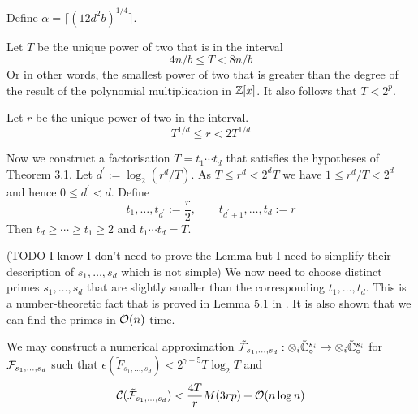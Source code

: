 Define $\alpha = \lceil (12d^2 b)^{1/4}\rceil$.





Let $T$ be the unique power of two that is in the interval
\begin{equation}
    4n/b \leq T < 8n/b
\end{equation}
Or in other words, the smallest power of two that is greater than the degree of the result of the polynomial multiplication in ${\mathbb Z}[x]$.
It also follows that $T < 2^p$.

Let $r$ be the unique power of two in the interval.
\[
    T^{1/d} \leq r < 2T^{1/d}
\]

Now we construct a factorisation $T = t_1 \cdots t_d$ that satisfies the hypotheses of Theorem 3.1. Let $d^\prime := \log_2(r^d / T)$. As $T \leq r^d < 2^d T$ we have $1 \leq r^d / T < 2^d$ and hence $0 \leq d^\prime < d$. Define
\[
    t_1, \ldots, t_{d^\prime} := \frac{r}{2}, \qquad t_{d^\prime + 1} , \ldots, t_d := r
\]
Then $t_d \geq \cdots \geq t_1 \geq 2$ and $t_1\cdots t_d = T$.

\medskip

(TODO I know I don't need to prove the Lemma but I need to simplify their description of $s_1, \ldots, s_d$ which is not simple)
\medskip
We now need to choose distinct primes $s_1, \ldots, s_d$ that are slightly smaller than the corresponding $t_1, \ldots, t_d$. This is a number-theoretic fact that is proved in Lemma $5.1$ in \cite{nlogn}. It is also shown that we can find the primes in $\mathcal O(n)$ time.

\begin{proposition}
    We may construct a numerical approximation $\tilde{\mathcal F}_{s_1, \ldots, s_d}: \otimes_i \tilde{{\mathbb C}}_\circ^{s_i} \to \otimes_i \tilde{{\mathbb C}}_\circ^{s_i}$ for $\mathcal F_{s_1, \ldots, s_d}$ such that $\epsilon(\tilde{F}_{s_1, \ldots, s_d}) < 2^{\gamma + 5} T \log_2 T$ and
    \[
        \mathcal C(\tilde{\mathcal F}_{s_1, \ldots, s_d}) < \frac{4T}{r} M(3rp) + \mathcal O(n \log n)
    \]
\end{proposition}

